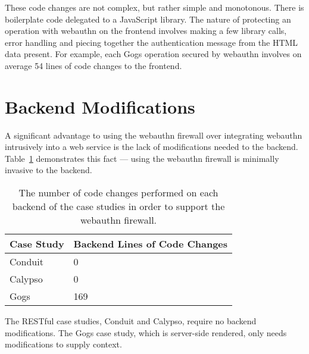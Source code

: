 These code changes are not complex, but rather simple and monotonous. There is boilerplate code delegated to a JavaScript library. The nature of protecting an operation with webauthn on the frontend involves making a few library calls, error handling and piecing together the authentication message from the HTML data present. For example, each Gogs operation secured by webauthn involves on average 54 lines of code changes to the frontend. 




\section{Backend Modifications}\label{Sec:BackendModifications}

A significant advantage to using the webauthn firewall over integrating webauthn intrusively into a web service is the lack of modifications needed to the backend. Table~\ref{Table:EvaluationsBackendModifications} demonstrates this fact --- using the webauthn firewall is minimally invasive to the backend.

\begin{table}[h]
\centering

\begin{tabular}{ m{4.5cm} m{6cm}  } 
 \hline
 Case Study & Backend Lines of Code Changes \\ 
 \hline \hline

 Conduit & 0 \\ \hline

 Calypso & 0 \\ \hline

 Gogs & 169 \\ \hline

\end{tabular}
\caption{The number of code changes performed on each backend of the case studies in order to support the webauthn firewall.}
\label{Table:EvaluationsBackendModifications}
\end{table}

The RESTful case studies, Conduit and Calypso, require no backend modifications. The Gogs case study, which is server-side rendered, only needs modifications to supply context. 

